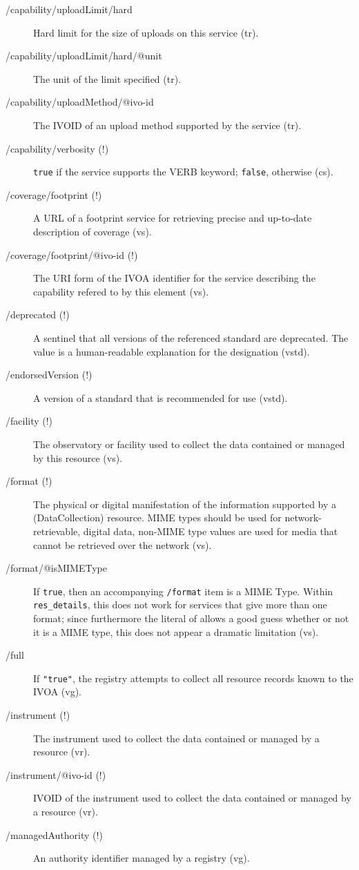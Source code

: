 \documentclass[11pt,a4paper]{ivoa}
\newcommand{\rtent}[1]{\texttt{\color{rtcolor} #1}}
\begin{document}
\begin{description}
\item[/capability/uploadLimit/hard]Hard limit for the size of uploads on this service (tr).
\item[/capability/uploadLimit/hard/@unit]The unit of the limit specified (tr).
\item[/capability/uploadMethod/@ivo-id]The IVOID of an upload method supported by the service (tr).
\item[/capability/verbosity (!)]\texttt{true} if the service supports the VERB keyword; \texttt{false}, otherwise (cs).
\item[/coverage/footprint (!)]A URL of a footprint service for retrieving precise and up-to-date description of coverage (vs).
\item[/coverage/footprint/@ivo-id (!)]The URI form of the IVOA identifier for the service describing the capability refered to by this element (vs).
\item[/deprecated (!)]A sentinel that all versions of the referenced standard are deprecated. The value is a human-readable explanation for the designation (vstd).
\item[/endorsedVersion (!)]A version of a standard that is recommended for use (vstd).
\item[/facility (!)]The observatory or facility used to collect the data contained or managed by this resource (vs).
\item[/format (!)]The physical or digital manifestation of the information supported by a (DataCollection) resource.  MIME types should be used for network-retrievable, digital data, non-MIME type values are used for media that cannot be retrieved over the network (vs).
\item[/format/@isMIMEType]If \texttt{true}, then an accompanying \texttt{/format} item is a MIME Type. Within \rtent{res\_details}, this does not work for services that give more than one format; since furthermore the literal of  allows a good guess whether or not it is a MIME type, this does not appear a dramatic limitation (vs).
\item[/full]If \verb|"true"|, the registry attempts to collect all resource records known to the IVOA (vg).
\item[/instrument (!)]The instrument used to collect the data contained or managed by a resource (vr).
\item[/instrument/@ivo-id (!)]IVOID of the instrument used to collect the data contained or managed by a resource (vr).
\item[/managedAuthority (!)]An authority identifier managed by a registry (vg).

\end{description}
\end{document}
